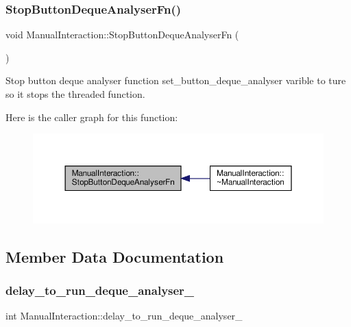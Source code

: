 \subsubsection{\texorpdfstring{Stop\+Button\+Deque\+Analyser\+Fn()}{StopButtonDequeAnalyserFn()}}
{\footnotesize\ttfamily void Manual\+Interaction\+::\+Stop\+Button\+Deque\+Analyser\+Fn (\begin{DoxyParamCaption}{ }\end{DoxyParamCaption})}



Stop button deque analyser function set\+\_\+button\+\_\+deque\+\_\+analyser varible to ture so it stops the threaded function. 

Here is the caller graph for this function\+:
\nopagebreak
\begin{figure}[H]
\begin{center}
\leavevmode
\includegraphics[width=350pt]{classManualInteraction_a251516a6a71bd8a966cfa771733e501b_icgraph}
\end{center}
\end{figure}


\subsection{Member Data Documentation}
\mbox{\label{classManualInteraction_a8e06f10a945fba499533c43eadb8a5f8}} 
\subsubsection{\texorpdfstring{delay\+\_\+to\+\_\+run\+\_\+deque\+\_\+analyser\+\_\+}{delay\_to\_run\_deque\_analyser\_}}
{\footnotesize\ttfamily int Manual\+Interaction\+::delay\+\_\+to\+\_\+run\+\_\+deque\+\_\+analyser\+\_\+\hspace{0.3cm}{\ttfamily [private]}}

